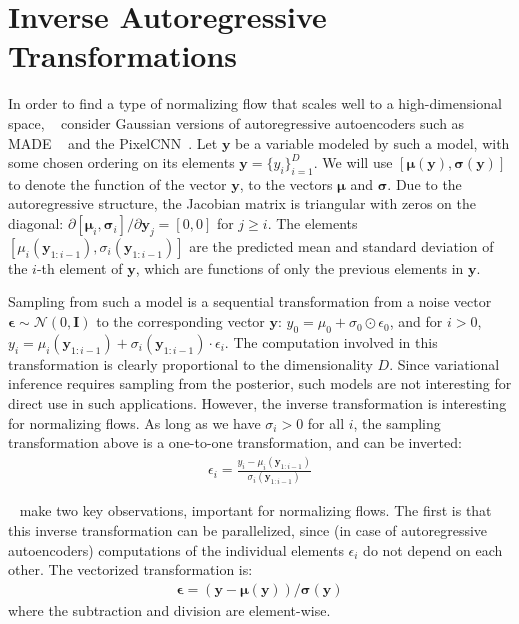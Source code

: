 \documentclass[MAL,biber]{nowfnt} %
\newcommand{\bb}[1]{\mathbf{#1}}
\newcommand{\by}{\bb{y}}
\newcommand{\bepsilon}{\boldsymbol{\epsilon}}
\newcommand{\bsigma}{\boldsymbol{\sigma}}
\newcommand{\bmu}{\boldsymbol{\mu}}
\begin{document}
\section{Inverse Autoregressive Transformations}
\label{sec:white}

In order to find a type of normalizing flow that scales well to a high-dimensional space, ~\cite{kingma2016improving} consider Gaussian versions of autoregressive autoencoders such as MADE ~\citep{germain2015made} and the PixelCNN~\citep{pixelrnn}. Let $\by$ be a variable modeled by such a model, with some chosen ordering on its elements $\by = \{y_i\}_{i=1}^D$. We will use $[\bmu(\by), \bsigma(\by)]$ to denote the function of the vector $\by$, to the vectors $\bmu$ and $\bsigma$. Due to the autoregressive structure, the Jacobian matrix is triangular with zeros on the diagonal: $\partial [\bmu_i, \bsigma_i] / \partial \by_j = [0,0]$ for $j \geq i$. The elements $[\mu_i(\by_{1:i-1}), \sigma_i(\by_{1:i-1})]$ are the predicted mean and standard deviation of the $i$-th element of $\by$, which are functions of only the previous elements in $\by$.

Sampling from such a model is a sequential transformation from a noise vector $\bepsilon \sim \mathcal{N}(0,\mathbf{I})$ to the corresponding vector $\by$: $y_{0} = \mu_0 + \sigma_{0} \odot \epsilon_{0}$, and for $i>0$, $y_i = \mu_i(\by_{1:i-1}) + \sigma_i(\by_{1:i-1}) \cdot \epsilon_i$. The computation involved in this transformation is clearly proportional to the dimensionality $D$. Since variational inference requires sampling from the posterior, such models are not interesting for direct use in such applications. However, the inverse transformation is interesting for normalizing flows. As long as we have $\sigma_i > 0$ for all $i$, the sampling transformation above is a one-to-one transformation, and can be inverted:
\begin{align}
\epsilon_i = \frac{y_i - \mu_i(\by_{1:i-1})}{\sigma_i(\by_{1:i-1})}
\end{align}

~\cite{kingma2016improving} make two key observations, important for normalizing flows. The first is that this inverse transformation can be parallelized, since (in case of autoregressive autoencoders) computations of the individual elements $\epsilon_i$ do not depend on each other. The vectorized transformation is:
\begin{align}
\bepsilon = (\by - \bmu(\by))/\bsigma(\by)
\label{eq:whitening}
\end{align}
where the subtraction and division are element-wise.
\end{document}
